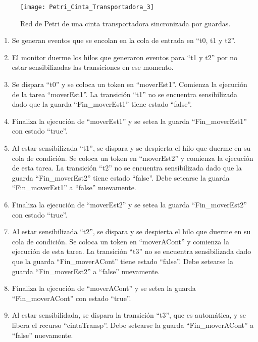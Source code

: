 \begin{figure}[H]
    \centering
    \texttt{[image: Petri\_Cinta\_Transportadora\_3]}
    \caption{Red de Petri de una cinta transportadora sincronizada por guardas.}
    \label{fig:petri_cinta_transportadora_3}
\end{figure}

\begin{enumerate}
    \item Se generan eventos que se encolan en la cola de entrada en “t0, t1 y
    t2”.
	\item El monitor duerme los hilos que generaron eventos para “t1 y t2” por
	no estar sensibilizadas las transiciones en ese momento.
	\item Se dispara ``t0'' y se coloca un token en ``moverEst1''. Comienza la
	ejecución de la tarea ``moverEst1''. La transición ``t1'' no se encuentra
	sensibilizada dado que la guarda ``Fin\_moverEst1'' tiene estado ``false''.
	\item Finaliza la ejecución de ``moverEst1'' y se setea la guarda
	``Fin\_moverEst1'' con estado ``true''.
	\item Al estar sensibilizada ``t1'', se dispara y se despierta el hilo que
	duerme en su cola de condición. Se coloca un token en ``moverEst2'' y
	comienza la ejecución de esta tarea. La transición ``t2'' no se
	encuentra sensibilizada dado que la guarda ``Fin\_moverEst2'' tiene estado
	``false''. Debe setearse la guarda ``Fin\_moverEst1'' a ``false'' nuevamente.
	\item Finaliza la ejecución de ``moverEst2'' y se setea la guarda
	``Fin\_moverEst2'' con estado ``true''.
	\item Al estar sensibilizada ``t2'', se dispara y se despierta el hilo que
	duerme en su cola de condición. Se coloca un token en ``moverACont'' y
	comienza la ejecución de esta tarea. La transición ``t3'' no se
	encuentra sensibilizada dado que la guarda ``Fin\_moverACont'' tiene estado
	``false''. Debe setearse la guarda ``Fin\_moverEst2'' a ``false'' nuevamente.
	\item Finaliza la ejecución de ``moverACont'' y se setea la guarda
	``Fin\_moverACont'' con estado ``true''.
	\item Al estar sensibilidada, se dispara la transición ``t3'', que es
	automática, y se libera el recurso ``cintaTransp''. Debe setearse la guarda
	``Fin\_moverACont'' a ``false'' nuevamente.
\end{enumerate}

